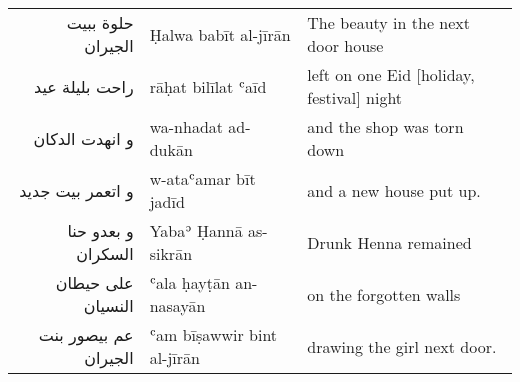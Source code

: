 \documentclass{article}
\begin{document}
\begin{center}
\begin{tabular}{ r l l }
\textarabic{حلوة ببيت الجيران}        & Ḥalwa babīt al-jīrān          & The beauty in the next door house \\
\textarabic{راحت بليلة عيد}           & rāḥat bilīlat ʿaīd            & left on one Eid [holiday, festival] night \\
\textarabic{و انهدت الدكان}           & wa-nhadat ad-dukān            & and the shop was torn down \\
\textarabic{و اتعمر بيت جديد}         & w-ataʿamar bīt jadīd          & and a new house put up. \\ 
\textarabic{و بعدو حنا السكران}       & Yabaʾ Ḥannā as-sikrān         & Drunk Henna remained \\
\textarabic{على حيطان النسيان}        & ʿala ḥayṭān an-nasayān        & on the forgotten walls \\ 
\textarabic{عم بيصور بنت الجيران}     & ʿam bīṣawwir bint al-jīrān    & drawing the girl next door. \\

\end{tabular}
\end{center} 
\end{document}
